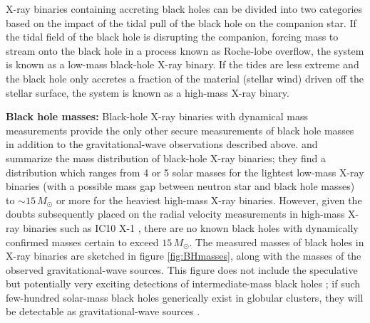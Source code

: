 \documentclass[iop,onecolumn]{revtex4}
\newcommand{\todo}[1]{\textcolor{red}{#1}}
\begin{document}
X-ray binaries containing accreting black holes can be divided into two categories based on the impact of the tidal pull of the black hole on the companion star.  If the tidal field of the black hole is disrupting the companion, forcing mass to stream onto the black hole in a process known as Roche-lobe overflow, the system is known as a low-mass black-hole X-ray binary.  If the tides are less extreme and the black hole only accretes a fraction of the material (stellar wind) driven off the stellar surface, the system is known as a high-mass X-ray binary.

\textbf{Black hole masses:} 
Black-hole X-ray binaries with dynamical mass measurements provide the only other secure measurements of black hole masses in addition to the gravitational-wave observations described above.  \citet{Ozel:2010} and \citet{Farr:2011} summarize the mass distribution of black-hole X-ray binaries; they find a distribution which ranges from 4 or 5 solar masses for the lightest low-mass X-ray binaries (with a possible mass gap between neutron star and black hole masses) to $\sim 15\, M_\odot$ or more for the heaviest high-mass X-ray binaries.  However, given the doubts subsequently placed on the radial velocity measurements in high-mass X-ray binaries such as IC10 X-1 \citep{Laycock:2015}, there are no known black holes with dynamically confirmed masses certain to exceed $15\, M_\odot$.  The measured masses of black holes in X-ray binaries are sketched in figure \ref{fig:BHmasses}, along with the masses of the observed gravitational-wave sources.  This figure does not include the speculative but potentially very exciting detections of intermediate-mass black holes \citep{MillerColbert:2004,Pasham:2014}; if such few-hundred solar-mass black holes generically exist in globular clusters, they will be detectable as gravitational-wave sources \citep[e.g.,][]{Mandel:2008}.
\end{document}
